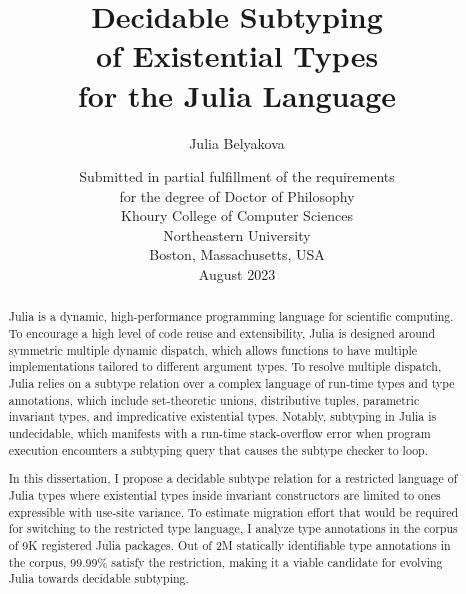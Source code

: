 \title{Decidable Subtyping\\ of Existential Types\\for the Julia Language}

\author{Julia Belyakova}

\date{\normalsize%
\vfill
\vspace{6cm}
Submitted in partial fulfillment of the requirements\\
for the degree of Doctor of Philosophy\\
\vspace{1em}
Khoury College of Computer Sciences\\
Northeastern University\\
Boston, Massachusetts, USA\\
\vspace{1em}
August 2023
}

\maketitle


\begin{abstract}

Julia is a dynamic, high-performance programming language
for scientific computing.
To encourage a high level of code reuse and extensibility, Julia is
designed around symmetric multiple dynamic dispatch, which allows functions
to have multiple implementations tailored to different argument types.
To resolve multiple dispatch, Julia relies on a subtype relation over a complex
language of run-time types and type annotations, 
which include set-theoretic unions, distributive tuples, parametric invariant 
types, and impredicative existential types.
Notably, subtyping in Julia is undecidable, which
manifests with a run-time stack-overflow error when program execution encounters
a subtyping query that causes the subtype checker to loop.

In this dissertation, I propose a decidable subtype relation for a restricted
language of Julia types where existential types inside invariant constructors
are limited to ones expressible with use-site variance.
To estimate migration effort that would be required for switching to the 
restricted type language, I analyze type annotations in the corpus of 9K
registered Julia packages.
Out of 2M statically identifiable type annotations in the corpus,
99.99\% satisfy the restriction, making it a viable candidate for
evolving Julia towards decidable subtyping.

\end{abstract}
